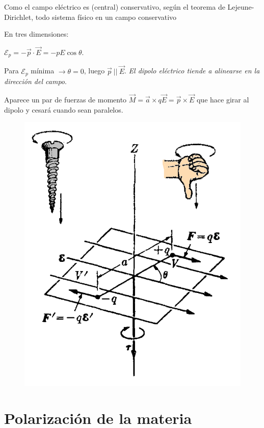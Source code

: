 \begin{multicols}{2}
Como el campo eléctrico es (central) conservativo, según el teorema de Lejeune-Dirichlet, todo sistema físico en un campo conservativo 

En tres dimensiones: 

$\mathcal E_p=-\vec p \cdot \vec E=-pE\cos \theta$. 

Para $\mathcal E_p$ mínima $\to \theta=0$, luego $\vec p \ || \ \vec E$. \emph{El dipolo eléctrico tiende a alinearse en la dirección del campo}.

Aparece un par de fuerzas de momento $\vec M=\vec a \times q\vec E=\vec p \times \vec E$ que hace girar al dipolo y cesará cuando sean paralelos.

\begin{figure}[H]
	\centering
	\includegraphics[width=.55\textwidth]{imagenes/imagenes24/T24IM06.png}
\end{figure}
\end{multicols}

\section{Polarización de la materia}


